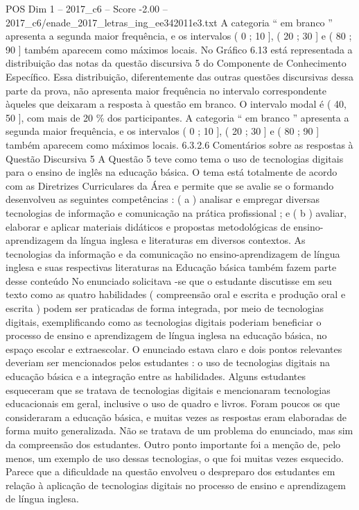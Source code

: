 \begin{textsample}{POS Dim 1 – 2017\_c6 – Score -2.00 – 2017\_c6/enade\_2017\_letras\_ing\_ee342011e3.txt}
A categoria “ em branco ” apresenta a segunda maior frequência, e os intervalos ( 0 ; 10 ], ( 20 ; 30 ] e ( 80 ; 90 ] também aparecem como máximos locais.
No Gráfico 6.13 está representada a distribuição das notas da questão discursiva 5 do Componente de Conhecimento Específico.
Essa distribuição, diferentemente das outras questões discursivas dessa parte da prova, não apresenta maior frequência no intervalo correspondente àqueles que deixaram a resposta à questão em branco.
O intervalo modal é ( 40, 50 ], com mais de 20 \% dos participantes.
A categoria “ em branco ” apresenta a segunda maior frequência, e os intervalos ( 0 ; 10 ], ( 20 ; 30 ] e ( 80 ; 90 ] também aparecem como máximos locais. 6.3.2.6 Comentários sobre as respostas à Questão Discursiva 5 A Questão 5 teve como tema o uso de tecnologias digitais para o ensino de inglês na educação básica.
O tema está totalmente de acordo com as Diretrizes Curriculares da Área e permite que se avalie se o formando desenvolveu as seguintes competências : ( a ) analisar e empregar diversas tecnologias de informação e comunicação na prática profissional ; e ( b ) avaliar, elaborar e aplicar materiais didáticos e propostas metodológicas de ensino-aprendizagem da língua inglesa e literaturas em diversos contextos.
As tecnologias da informação e da comunicação no ensino-aprendizagem de língua inglesa e suas respectivas literaturas na Educação básica também fazem parte desse conteúdo No enunciado solicitava -se que o estudante discutisse em seu texto como as quatro habilidades ( compreensão oral e escrita e produção oral e escrita ) podem ser praticadas de forma integrada, por meio de tecnologias digitais, exemplificando como as tecnologias digitais poderiam beneficiar o processo de ensino e aprendizagem de língua inglesa na educação básica, no espaço escolar e extraescolar.
O enunciado estava claro e dois pontos relevantes deveriam ser mencionados pelos estudantes : o uso de tecnologias digitais na educação básica e a integração entre as habilidades.
Alguns estudantes esqueceram que se tratava de tecnologias digitais e mencionaram tecnologias educacionais em geral, inclusive o uso de quadro e livros.
Foram poucos os que consideraram a educação básica, e muitas vezes as respostas eram elaboradas de forma muito generalizada.
Não se tratava de um problema do enunciado, mas sim da compreensão dos estudantes.
Outro ponto importante foi a menção de, pelo menos, um exemplo de uso dessas tecnologias, o que foi muitas vezes esquecido.
Parece que a dificuldade na questão envolveu o despreparo dos estudantes em relação à aplicação de tecnologias digitais no processo de ensino e aprendizagem de língua inglesa.

\end{textsample}

